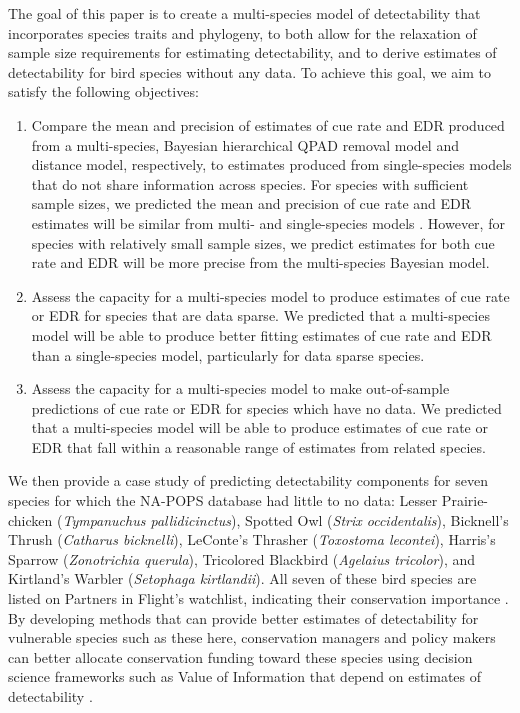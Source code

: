 \documentclass[12pt]{article}
\begin{document}
\par The goal of this paper is to create a multi-species model of detectability that incorporates species traits and phylogeny, to both allow for the relaxation of sample size requirements for estimating detectability, and to derive estimates of detectability for bird species without any data.
To achieve this goal, we aim to satisfy the following objectives:
\begin{enumerate}
	\item Compare the mean and precision of estimates of cue rate and EDR produced from a multi-species, Bayesian hierarchical QPAD removal model and distance model, respectively, to estimates produced from single-species models that do not share information across species.
	For species with sufficient sample sizes, we predicted the mean and precision of cue rate and EDR estimates will be similar from multi- and single-species models \citep{edwards_point_2023}.
	However, for species with relatively small sample sizes, we predict estimates for both cue rate and EDR will be more precise from the multi-species Bayesian model.
	\item Assess the capacity for a multi-species model to produce estimates of cue rate or EDR for species that are data sparse.
	We predicted that a multi-species model will be able to produce better fitting estimates of cue rate and EDR than a single-species model, particularly for data sparse species.
	\item Assess the capacity for a multi-species model to make out-of-sample predictions of cue rate or EDR for species which have no data.
	We predicted that a multi-species model will be able to produce estimates of cue rate or EDR that fall within a reasonable range of estimates from related species.
\end{enumerate}

We then provide a case study of predicting detectability components for seven species for which the NA-POPS database had little to no data: Lesser Prairie-chicken (\textit{Tympanuchus pallidicinctus}), Spotted Owl (\textit{Strix occidentalis}), Bicknell’s Thrush (\textit{Catharus bicknelli}), LeConte’s Thrasher (\textit{Toxostoma lecontei}), Harris’s Sparrow (\textit{Zonotrichia querula}), Tricolored Blackbird (\textit{Agelaius tricolor}), and Kirtland’s Warbler (\textit{Setophaga kirtlandii}). 	
All seven of these bird species are listed on Partners in Flight’s watchlist, indicating their conservation importance \citep{will_handbook_2020}.
By developing methods that can provide better estimates of detectability for vulnerable species such as these here, conservation managers and policy makers can better allocate conservation funding toward these species using decision science frameworks such as Value of Information that depend on estimates of detectability \citep{bennett_how_2024}.
\end{document}
